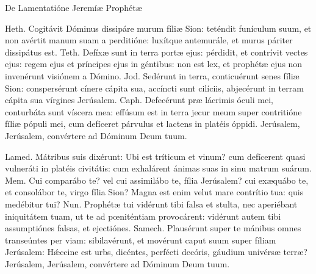 





\lesson

De Lamentatióne Jeremíæ Prophétæ


Heth. Cogitávit Dóminus dissipáre murum fíliæ Sion: teténdit funículum
suum, et non avértit manum suam a perditióne: luxítque antemurále, et
murus páriter dissipátus est. Teth. Defíxæ sunt in terra portæ ejus:
pérdidit, et contrívit vectes ejus: regem ejus et príncipes ejus in
géntibus: non est lex, et prophétæ ejus non invenérunt visiónem a
Dómino. Jod. Sedérunt in terra, conticuérunt senes fíliæ Sion:
conspersérunt cínere cápita sua, accíncti sunt cilíciis, abjecérunt in
terram cápita sua vírgines Jerúsalem. Caph. Defecérunt præ lácrimis
óculi mei, conturbáta sunt víscera mea: effúsum est in terra jecur meum
super contritióne fíliæ pópuli mei, cum defíceret párvulus et lactens
in platéis óppidi. Jerúsalem, Jerúsalem, convértere ad Dóminum Deum
tuum.


\lesson


Lamed. Mátribus suis dixérunt: Ubi est tríticum et vinum? cum
defícerent quasi vulneráti in platéis civitátis: cum exhalárent ánimas
suas in sinu matrum suárum. Mem. Cui comparábo te? vel cui assimilábo
te, fília Jerúsalem? cui exæquábo te, et consolábor te, virgo fília
Sion? Magna est enim velut mare contrítio tua: quis medébitur tui? Nun.
Prophétæ tui vidérunt tibi falsa et stulta, nec aperiébant iniquitátem
tuam, ut te ad pœniténtiam provocárent: vidérunt autem tibi
assumptiónes falsas, et ejectiónes. Samech. Plausérunt super te mánibus
omnes transeúntes per viam: sibilavérunt, et movérunt caput suum super
fíliam Jerúsalem: Hǽccine est urbs, dicéntes, perfécti decóris, gáudium
univérsæ terræ? Jerúsalem, Jerúsalem, convértere ad Dóminum Deum tuum.

